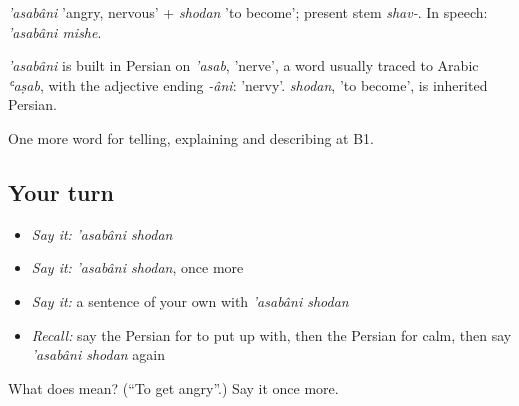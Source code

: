 \emph{'asabâni} 'angry, nervous' + \emph{shodan} 'to become'; present stem \emph{shav-}. In speech: \emph{'asabâni mishe}.

\begin{cousinweb}
\emph{'asabâni} is built in Persian on \emph{'asab}, 'nerve', a word usually traced to Arabic \emph{ʿaṣab}, with the adjective ending \emph{-âni}: 'nervy'. \emph{shodan}, 'to become', is inherited Persian.
\end{cousinweb}

\begin{grammarlens}[title={What you've built}]
One more word for telling, explaining and describing at B1.
\end{grammarlens}

\subsection*{Your turn}
\begin{itemize}
\raggedright
  \item \emph{Say it:} \emph{'asabâni shodan}
  \item \emph{Say it:} \emph{'asabâni shodan}, once more
  \item \emph{Say it:} a sentence of your own with \emph{'asabâni shodan}
  \item \emph{Recall:} say the Persian for to put up with, then the Persian for calm, then say \emph{'asabâni shodan} again
\end{itemize}

\begin{tcolorbox}[breakable,colback=teal!4,colframe=teal!35!black,title={Before you move on}]
What does   mean? (\textquotedblleft{}To get angry\textquotedblright{}.) Say it once more.
\end{tcolorbox}
